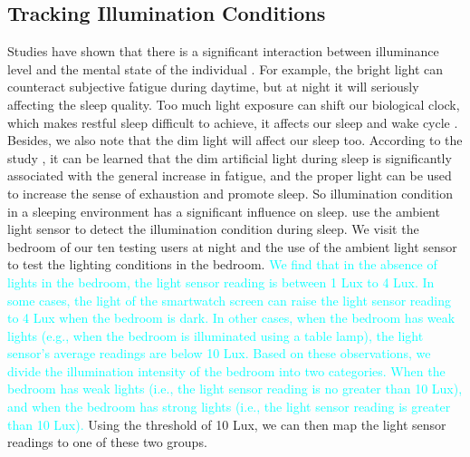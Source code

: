 \subsection{Tracking Illumination Conditions \label{sec:illumination}}
Studies have shown that there is a significant interaction between illuminance level and the mental state of the individual \cite{light77}.
For example, the bright light can counteract subjective fatigue during daytime, but at night it will seriously affecting the sleep quality.
Too much light exposure can shift our biological clock, which makes restful sleep difficult to achieve, it affects our sleep and wake cycle
\cite{light2007}.  Besides, we also note that the dim light will affect our sleep too. According to the study \cite{light2016}, it can be
learned that the dim artificial light during sleep is significantly associated with the general increase in fatigue, and the proper light
can be used to increase the sense of exhaustion and promote sleep. So illumination condition in a sleeping environment has a significant
influence on sleep. {\systemname} use the ambient light sensor to detect the illumination condition during sleep. We visit the bedroom of
our ten testing users at night and the use of the ambient light sensor to test the lighting conditions in the bedroom. \textcolor{cyan}{We
find that in the absence of lights in the bedroom, the light sensor reading is between 1 Lux to 4 Lux. In some cases, the light of the
smartwatch screen can raise the light sensor reading to 4 Lux when the bedroom is dark. In other cases, when the bedroom has weak lights
(e.g., when the bedroom is illuminated using a table lamp), the light sensor's average readings are below 10 Lux. Based on these
observations, we divide the illumination intensity of the bedroom into two categories. When the bedroom has weak lights (i.e., the light
sensor reading is no greater than 10 Lux), and when the bedroom has strong lights (i.e., the light sensor reading is greater than 10 Lux).}
Using the threshold of 10 Lux, we can then map the light sensor readings to one of these two groups.


